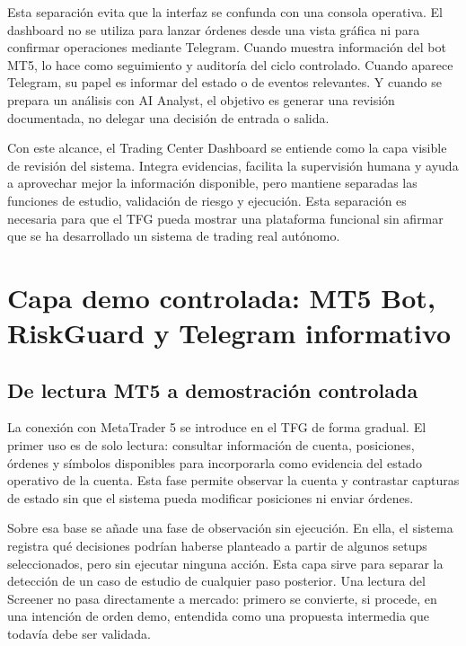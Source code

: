 Esta separaci\'on evita que la interfaz se confunda con una consola operativa.
El dashboard no se utiliza para lanzar \'ordenes desde una vista gr\'afica ni para
confirmar operaciones mediante Telegram. Cuando muestra informaci\'on del bot
MT5, lo hace como seguimiento y auditor\'ia del ciclo controlado. Cuando aparece
Telegram, su papel es informar del estado o de eventos relevantes. Y cuando se
prepara un an\'alisis con AI Analyst, el objetivo es generar una revisi\'on
documentada, no delegar una decisi\'on de entrada o salida.

Con este alcance, el Trading Center Dashboard se entiende como la capa visible de
revisi\'on del sistema. Integra evidencias, facilita la supervisi\'on humana y
ayuda a aprovechar mejor la informaci\'on disponible, pero mantiene separadas las
funciones de estudio, validaci\'on de riesgo y ejecuci\'on. Esta separaci\'on es
necesaria para que el TFG pueda mostrar una plataforma funcional sin afirmar
que se ha desarrollado un sistema de trading real aut\'onomo.

\section{Capa demo controlada: MT5 Bot, RiskGuard y Telegram informativo}
\label{sec:capa-demo-mt5-riskguard-telegram}

\subsection{De lectura MT5 a demostraci\'on controlada}
\label{subsec:mt5-lectura-demostracion-controlada}

La conexi\'on con MetaTrader 5 se introduce en el TFG de forma gradual. El primer
uso es de solo lectura: consultar informaci\'on de cuenta, posiciones, \'ordenes y
s\'imbolos disponibles para incorporarla como evidencia del estado operativo de
la cuenta.
Esta fase permite observar la cuenta y contrastar capturas de estado sin que el
sistema pueda modificar posiciones ni enviar \'ordenes.

Sobre esa base se a\~nade una fase de observaci\'on sin ejecuci\'on. En ella, el
sistema registra qu\'e decisiones podr\'ian haberse planteado a partir de algunos
setups seleccionados, pero sin ejecutar ninguna acci\'on. Esta capa sirve para
separar la detecci\'on de un caso de estudio de cualquier paso posterior. Una
lectura del Screener no pasa directamente a mercado: primero se convierte, si
procede, en una intenci\'on de orden demo, entendida como una propuesta
intermedia que todav\'ia debe ser validada.

